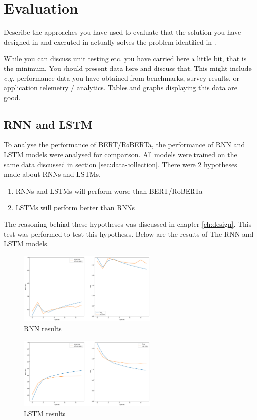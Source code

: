 \chapter{Evaluation}
\label{ch:evaluation}

Describe the approaches you have used to evaluate that the solution you have designed in  and executed in  actually solves the problem identified in .

While you can discuss unit testing etc. you have carried here a little bit, that is the minimum. You should present data here and discuss that. This might include \emph{e.g.} performance data you have obtained from benchmarks, survey results, or application telemetry / analytics. Tables and graphs displaying this data are good.

\section{RNN and LSTM}
\label{sec:rnn-lstm}
To analyse the performance of BERT/RoBERTa, the performance of RNN and LSTM models were analysed for comparison. All models
were trained on the same data discussed in section \ref{sec:data-collection}. There were 2 hypotheses made about RNNs and LSTMs. 
\begin{enumerate}
    \item RNNs and LSTMs will perform worse than BERT/RoBERTa
    \item LSTMs will perform better than RNNs
\end{enumerate}
The reasoning behind these hypotheses was discussed in chapter \ref{ch:design}.
This test was performed to test this hypothesis. Below are the results of The RNN and LSTM models.
\begin{figure}
    \centering
    \includegraphics[width=0.6\textwidth]{../images/rnn-acc.png}
    \caption{RNN results}
    \label{fig:rnn-acc}
\end{figure}
\begin{figure}
    \centering
    \includegraphics[width=0.6\textwidth]{../images/lstm-acc.png}
    \caption{LSTM results}
    \label{fig:lstm-acc}
\end{figure}

